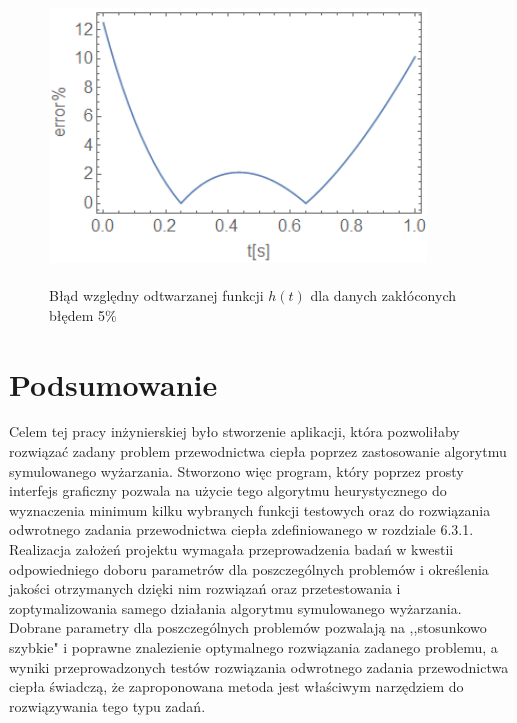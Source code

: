 \documentclass[twoside]{projektInzynierskiMS1}
\newcommand{\si}{ś}
\begin{document}
\begin{figure}[H]
\begin{center}
		\includegraphics[height=7cm, width=10cm]{pics/5abs.png}\\
	\caption{Błąd względny odtwarzanej funkcji $h(t)$ dla danych zakłóconych błędem 5\%}
\end{center}
\end{figure}



\section{Podsumowanie}
Celem tej pracy inżynierskiej było stworzenie aplikacji, która pozwoliłaby rozwiązać zadany problem przewodnictwa ciepła poprzez zastosowanie algorytmu symulowanego wyżarzania. Stworzono więc program, który poprzez prosty interfejs graficzny pozwala na użycie tego algorytmu heurystycznego do wyznaczenia minimum kilku wybranych funkcji testowych oraz do rozwiązania odwrotnego zadania przewodnictwa ciepła zdefiniowanego w rozdziale 6.3.1. \\

Realizacja założeń projektu wymagała przeprowadzenia badań w kwestii odpowiedniego doboru parametrów dla poszczególnych problemów i okre\si lenia jako\si ci otrzymanych dzięki nim rozwiązań oraz przetestowania i zoptymalizowania samego działania algorytmu symulowanego wyżarzania. Dobrane parametry dla poszczególnych problemów pozwalają na ,,stosunkowo szybkie" i poprawne znalezienie optymalnego rozwiązania zadanego problemu, a wyniki przeprowadzonych testów rozwiązania odwrotnego zadania przewodnictwa ciepła \si wiadczą, że zaproponowana metoda jest wła\si ciwym narzędziem do rozwiązywania tego typu zadań. \\
\end{document}
